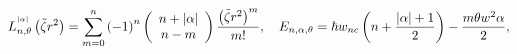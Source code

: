 \begin{equation}
L_{n,\theta}^{^{\left|  \alpha\right|  }}\left(  \tilde{\zeta}r^{2}\right)
=\overset{n}{\underset{m=0}{\sum}}\left(  -1\right)  ^{n}\left(
\begin{array}
[c]{c}%
n+\left|  \alpha\right| \\
n-m
\end{array}
\right)  \frac{\left(  \tilde{\zeta}r^{2}\right)  ^{m}}{m!},\text{
\ \ }E_{n,\alpha,\theta}=\hbar w_{nc}\left(  n+\frac{\left|  \alpha\right|
+1}{2}\right)  -\frac{m\theta w^{2}\alpha}{2},\label{48}%
\end{equation}

